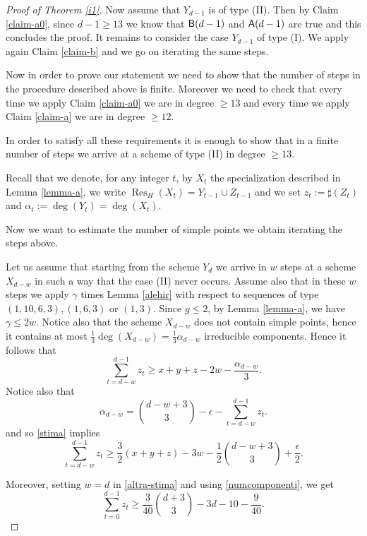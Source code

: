 \documentclass{amsart}
\theoremstyle{plain}
\theoremstyle{definition}
\begin{document}
\begin{proof}[Proof of Theorem \ref{i1}]
Now assume that $Y_{d-1}$ is of type (II). Then by Claim
\ref{claim-a0}, since $d-1\ge13$ we know that ${\sf{B}}(d-1)$ and
${\sf{{A}}}(d-1)$ are true and this concludes the proof.
It remains to consider the case $Y_{d-1}$ of type (I).
We apply again Claim \ref{claim-b} and we go on iterating the same
steps.

\smallskip

Now in order to prove our statement we need to show that the
number of steps in the procedure described above is finite.
Moreover we need to check that every time we apply Claim \ref{claim-a0} we are in degree
$\geq13$ and every time we apply Claim \ref{claim-a} we are in degree
$\geq12$.

In order to satisfy all these requirements it is enough to show that in a
finite number of steps we arrive at a scheme of type (II)
in degree $\ge13$.

Recall that we denote, for any integer $t$,
by $X_t$ the specialization described in Lemma \ref{lemma-a},
we write $\operatorname{Res}_H(X_t)=Y_{t-1}\cup Z_{t-1}$ and we set
$z_{t}:= \sharp (Z_{t})$ and
$\alpha_{t}:=\deg(Y_{t})=\deg(X_{t})$.

Now we want to estimate the number of simple points we obtain
iterating the steps above.

Let us assume that starting from the scheme $Y_d$ we arrive in $w$
steps at a scheme $X_{d-w}$ in such a way that the case (II) never
occurs.
Assume also that in these $w$
steps we apply $\gamma$ times Lemma \ref{alehir} with respect to sequences
of type $(1,10,6,3), (1,6,3)$ or $(1,3)$.
Since $g \le 2$, by Lemma \ref{lemma-a}, we have $\gamma\le 2w$. Notice also that the scheme $X_{d-w}$
does not contain simple points, hence it contains at most
$\frac{1}{3}\deg(X_{d-w})=\frac{1}{3}\alpha_{d-w}$ irreducible components.
Hence it follows that
\begin{equation}\label{stima}
\sum _{t=d-w}^{d-1} z_{t}\ge x+y+z-2w-\frac{\alpha_{d-w}}{3}.
\end{equation}
Notice also that
\begin{equation}\label{alfa}
\alpha_{d-w}=\binom{d-w+3}{3}-\epsilon-\sum _{t=d-w}^{d-1} z_{t}.
\end{equation}
and so \eqref{stima} implies
\begin{equation}\label{altra-stima}
\sum _{t=d-w}^{d-1} z_{t}\ge
\frac{3}{2}(x+y+z)-3w-\frac{1}{2}\binom{d-w+3}{3}+\frac{\epsilon}{2}.
\end{equation}

Moreover, setting $w=d$ in \eqref{altra-stima} and
using \eqref{numcomponenti}, we get
\begin{equation}\label{stima-tre}
\sum_{t=0}^{d-1} z_{t} \ge
\frac{3}{40}\binom{d+3}{3}-3d-10-\frac{9}{40}.
\end{equation}


\end{proof}
\end{document}

